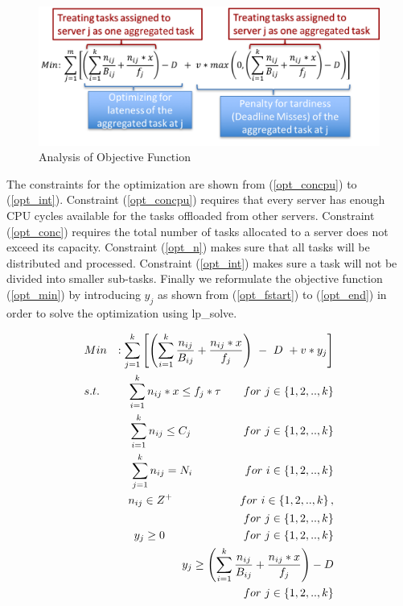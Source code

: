 \begin{figure}[ht!]
\centering
\includegraphics[width=1\linewidth]{images/opt_ill}
\caption{Analysis of Objective Function}
\label{opt_ill}
\end{figure}
\normalsize

The constraints for the optimization are shown from (\ref{opt_concpu}) to (\ref{opt_int}). Constraint (\ref{opt_concpu}) requires that every server has enough CPU cycles available for the tasks offloaded from other servers. Constraint (\ref{opt_conc}) requires the total number of tasks allocated to a server does not exceed its capacity. Constraint (\ref{opt_n}) makes sure that all tasks will be distributed and processed. Constraint (\ref{opt_int}) makes sure a task will not be divided into smaller sub-tasks. Finally we reformulate the objective function (\ref{opt_min}) by introducing $y_{j}$ as shown from (\ref{opt_fstart}) to (\ref{opt_end}) in order to solve the optimization using lp\_solve\cite{lpsolve}.



\setlength{\arraycolsep}{0.0em}
\begin{eqnarray}
\small
\label{opt_fstart}
&Min&: \sum_{j=1}^{k}\left [\left (\sum\limits_{i=1}^{k} \frac{n_{ij}}{B_{ij}}+\frac{n_{ij}*x}{f_{j}} \right ) \ - \ D \ + v * y_{j} \right ]\\
\label{opt_concpu2}
&s.t.& \sum_{i=1}^{k} n_{ij}*x\leq f_{j}*\tau  \qquad for \ j\in \left \{ 1,2,..,k \right \}\\
\label{opt_conc2}
&\phantom{s.t.}& \sum_{i=1}^{k} n_{ij}\leq C_{j} \ \ \qquad\quad\quad for \ j\in \left \{ 1,2,..,k \right \}\\
\label{opt_n2}
&\phantom{s.t.}& \sum_{j=1}^{k} n_{ij}=N_{i} \  \ \qquad \quad \quad for \ i\in \left \{ 1,2,..,k \right \} \\
\label{opt_int2}
&\phantom{s.t.}&  n_{ij}\in Z^{+} \qquad \qquad \qquad  for \ i\in \left \{ 1,2,..,k \right \} ,\nonumber\\
&\phantom{s.t.}& \phantom{n_{ij}\in Z^{+}}  \qquad \qquad \qquad for \ j\in \left \{ 1,2,..,k \right \}\\
\label{opt_y}
&\phantom{s.t.}& y_{j}\geq 0 \ \ \ \qquad\qquad\qquad for \ j\in \left \{ 1,2,..,k \right \}\\
\label{opt_end}
&\phantom{s.t.}& y_{j}\geq \left (\sum\limits_{i=1}^{k} \frac{n_{ij}}{B_{ij}}+\frac{n_{ij}*x}{f_{j}} \right )-D \nonumber\\ 
&\phantom{s.t.}&\qquad\qquad\qquad\qquad\qquad for \ j\in \left \{ 1,2,..,k \right \}
\end{eqnarray}
\setlength{\arraycolsep}{5pt}
\normalsize

